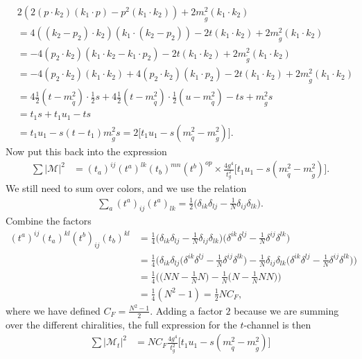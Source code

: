 \documentclass[11pt]{article}
\begin{document}
\begin{flushleft}
\begin{align*}
&2(2 (p \cdot k_2) (k_1 \cdot p) - p^2 (k_1 \cdot k_2) ) + 2m_{\tilde{g}}^2 (k_1 \cdot k_2)\\ &= 4((k_2 - p_2) \cdot k_2) (k_1 \cdot (k_2-p_2)) - 2t (k_1 \cdot k_2) + 2m_{\tilde{g}}^2 (k_1 \cdot k_2)\\
&=-4(p_2 \cdot k_2)(k_1 \cdot k_2 - k_1 \cdot p_2) - 2t(k_1 \cdot k_2) + 2m_{\tilde{g}}^2 (k_1 \cdot k_2)\\
&= -4 (p_2 \cdot k_2)(k_1 \cdot k_2) + 4(p_2 \cdot k_2)(k_1 \cdot p_2) - 2t (k_1 \cdot k_2) + 2m_{\tilde{g}}^2 (k_1 \cdot k_2)\\
&= 4 \frac{1}{2}(t-m_{\tilde{q}}^2)\cdot \frac{1}{2}s + 4 \frac{1}{2}(t-m_{\tilde{q}}^2)\cdot \frac{1}{2}(u-m_{\tilde{q}}^2)-  ts + m_{\tilde{g}}^2 s\\
&= t_1s+t_1u_1 -ts\\
&= t_1u_1 - s(t-t_1) m_{\tilde{g}}^2 s = 2 \big[t_1u_1 -s(m_{\tilde{q}}^2 - m_{\tilde{g}}^2) \big].
\end{align*}
Now put this back into the expression 
\begin{align*}
\sum |\mathcal{M}|^2 &=   (t_a)^{ij} (t^a)^{lk} (t_b)^{mn} (t^b)^{op}  \times\frac{4 g^4}{t_g^2}  \big[t_1u_1 -s(m_{\tilde{q}}^2- m_{\tilde{g}}^2) \big].
\end{align*}
We still need to sum over colors, and we use the relation
\begin{align*}
\sum_a (t^a)_{ij}(t^a)_{lk} = \frac{1}{2} \big(\delta_{ik} \delta_{lj} - \frac{1}{N} \delta_{ij} \delta_{lk} \big).
\end{align*}
Combine the factors
\begin{align*}
(t^a)^{ij}(t_a)^{kl}(t^b)_{ij}(t_b)^{kl} &= \frac{1}{4} 
\big(\delta_{ik} \delta_{lj} - \frac{1}{N} \delta_{ij} \delta_{lk} \big)
\big(\delta^{ik} \delta^{lj} - \frac{1}{N} \delta^{ij} \delta^{lk} \big)\\
&= \frac{1}{4} \Big(\delta_{ik} \delta_{lj}\big(\delta^{ik} \delta^{lj} - \frac{1}{N} \delta^{ij} \delta^{lk} \big) - \frac{1}{N} \delta_{ij} \delta_{lk}\big(\delta^{ik} \delta^{lj} - \frac{1}{N} \delta^{ij} \delta^{lk} \big) \Big)\\
&= \frac{1}{4} \Big(\big(N N - \frac{1}{N} N \big)  - \frac{1}{N} \big(N - \frac{1}{N} N N \big) \Big)\\
&= \frac{1}{4} (N^2 - 1) = \frac{1}{2}NC_F,
\end{align*}
where we have defined $C_F = \frac{N^2 -1}{2}$. Adding a factor $2$ because we are summing over the different chiralities, the full expression for the $t$-channel is then
\begin{align*}
\sum |\mathcal{M}_t|^2 &= NC_F \frac{4g^4}{t_g^2} \big[ t_1u_1-s(m_{\tilde{q}}^2-m_{\tilde{g}}^2) \big]
\end{align*}
\end{flushleft}
\end{document}
